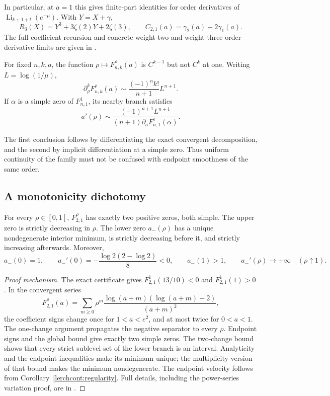 In particular, at $a=1$ this gives finite-part identities for order derivatives
of $\operatorname{Li}_{k+1+t}(e^{-\mu})$. With $Y=X+\gamma$,
\[
 R_3(X)=Y^3+3\zeta(2)Y+2\zeta(3),\qquad
 C_{2,1}(a)=\gamma_2(a)-2\gamma_1(a).
\]
The full coefficient recursion and concrete weight-two and weight-three
order-derivative limits are given in \cite{lerchcont2026}.

\begin{corollary}\label{lerchcont:regularity}
For fixed $n,k,a$, the function $\rho\mapsto F_{n,k}^{\rho}(a)$ is
$C^{k-1}$ but not $C^k$ at one. Writing $L=\log(1/\mu)$,
\[
 \partial_\rho^k F_{n,k}^{\rho}(a)
 \sim\frac{(-1)^n k!}{n+1}L^{n+1}.
\]
If $\alpha$ is a simple zero of $F_{n,1}^{1}$, its nearby branch satisfies
\[
 a'(\rho)\sim
 \frac{(-1)^{n+1}L^{n+1}}
 {(n+1)\partial_aF_{n,1}^{1}(\alpha)}.
\]
\end{corollary}
The first conclusion follows by differentiating the exact convergent
decomposition, and the second by implicit differentiation at a simple zero.
Thus uniform continuity of the family must not be confused with endpoint
smoothness of the same order.

\subsection{A monotonicity dichotomy}
\begin{theorem}\label{lerchcont:n2}
For every $\rho\in[0,1]$, $F_{2,1}^{\rho}$ has exactly two positive zeros,
both simple. The upper zero is strictly decreasing in $\rho$. The lower zero
$a_-(\rho)$ has a unique nondegenerate interior minimum, is strictly decreasing
before it, and strictly increasing afterwards. Moreover,
\[
 a_-(0)=1,\qquad
 a_-'(0)=-\frac{\log2(2-\log2)}8<0,\qquad a_-(1)>1,
 \qquad a_-'(\rho)\longrightarrow+\infty\quad(\rho\uparrow1).
\]
\end{theorem}
\begin{proof}[Proof mechanism]
The exact certificate gives $F_{2,1}^{1}(13/10)<0$ and $F_{2,1}^{1}(1)>0$.
In the convergent series
\[
 F_{2,1}^{\rho}(a)=\sum_{m\ge0}\rho^m
 \frac{\log(a+m)(\log(a+m)-2)}{(a+m)^2},
\]
the coefficient signs change once for $1<a<e^2$, and at most twice for
$0<a<1$. The one-change argument propagates the negative separator to every
$\rho$. Endpoint signs and the global bound give exactly two simple zeros.
The two-change bound shows that every strict sublevel set of the lower branch
is an interval. Analyticity and the endpoint inequalities make its minimum
unique; the multiplicity version of that bound makes the minimum
nondegenerate. The endpoint velocity follows from
Corollary~\ref{lerchcont:regularity}. Full details, including the power-series
variation proof, are in \cite{lerchcont2026}.
\end{proof}

